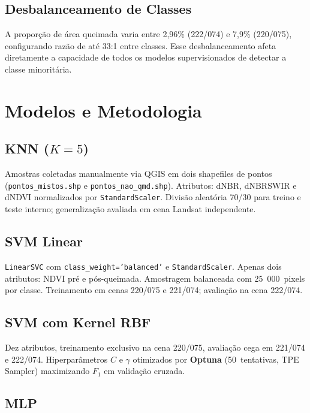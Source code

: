 \documentclass[conference]{IEEEtran}
\begin{document}
\subsection{Desbalanceamento de Classes}

A proporção de área queimada varia entre 2,96\% (222/074) e 7,9\%
(220/075), configurando razão de até 33:1 entre classes. Esse
desbalanceamento afeta diretamente a capacidade de todos os modelos
supervisionados de detectar a classe minoritária.

\section{Modelos e Metodologia}

\subsection{KNN ($K=5$)}

Amostras coletadas manualmente via QGIS em dois shapefiles de pontos
(\texttt{pontos\_mistos.shp} e \texttt{pontos\_nao\_qmd.shp}). Atributos:
dNBR, dNBRSWIR e dNDVI normalizados por \texttt{StandardScaler}. Divisão
aleatória 70/30 para treino e teste interno; generalização avaliada em
cena Landsat independente.

\subsection{SVM Linear}

\texttt{LinearSVC} com \texttt{class\_weight='balanced'} e
\texttt{StandardScaler}. Apenas dois atributos: NDVI pré e pós-queimada.
Amostragem balanceada com 25~000~pixels por classe. Treinamento em cenas
220/075 e 221/074; avaliação na cena 222/074.

\subsection{SVM com Kernel RBF}

Dez atributos, treinamento exclusivo na cena 220/075, avaliação cega em
221/074 e 222/074. Hiperparâmetros $C$ e $\gamma$ otimizados por
\textbf{Optuna} (50~tentativas, TPE Sampler) maximizando $F_1$ em
validação cruzada.

\subsection{MLP}
\end{document}
